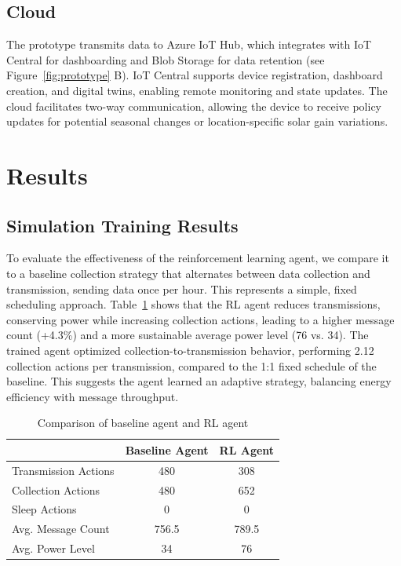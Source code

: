 \documentclass[10pt]{cai}
\begin{document}
\subsection{Cloud}
The prototype transmits data to Azure IoT Hub, which integrates with IoT Central for dashboarding and Blob Storage for data retention (see Figure~\ref{fig:prototype} B). 
IoT Central supports device registration, dashboard creation, and digital twins, enabling remote monitoring and state updates.
The cloud facilitates two-way communication, allowing the device to receive policy updates for potential seasonal changes or location-specific solar gain variations.


\section{Results}

\subsection{Simulation Training Results}
To evaluate the effectiveness of the reinforcement learning agent, we compare it to a baseline collection strategy that alternates between data collection and transmission, sending data once per hour. 
This represents a simple, fixed scheduling approach.
Table~\ref{tab:agent_comparison} shows that the RL agent reduces transmissions, conserving power while increasing collection actions, leading to a higher message count (+4.3\%) and a more sustainable average power level (76 vs. 34).
The trained agent optimized collection-to-transmission behavior, performing 2.12 collection actions per transmission, compared to the 1:1 fixed schedule of the baseline. 
This suggests the agent learned an adaptive strategy, balancing energy efficiency with message throughput.


\begin{table}[h]
  \centering
  \caption{Comparison of baseline agent and RL agent}
  \begin{tabular}{lcc}
      \toprule
      & Baseline Agent & RL Agent \\
      \midrule
      Transmission Actions & 480 & 308 \\
      Collection Actions & 480 & 652 \\
      Sleep Actions & 0 & 0 \\
      Avg. Message Count & 756.5 & 789.5 \\
      Avg. Power Level & 34 & 76 \\
      \bottomrule
  \end{tabular}
  \label{tab:agent_comparison}
\end{table}
\end{document}
